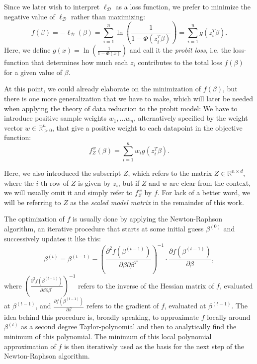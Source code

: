 \noindent Since we later wish to interpret $\ell_\mathcal{D}$ as a loss function, we prefer
to minimize the negative value of $\ell_\mathcal{D}$ rather than maximizing:
\begin{equation}
    f(\beta) = -\ell_\mathcal{D}(\beta)
    = \sum_{i=1}^n \ln \left( \frac{1}{1 - \Phi(z_i^T \beta)} \right)
    = \sum_{i=1}^n g(z_i^T \beta).
\end{equation}
Here, we define $g(x) = \ln \left(\frac{1}{1 - \Phi(x)}\right)$
and call it the \textit{probit loss}, i.e. the loss-function that
determines how much each $z_i$ contributes to the total loss $f(\beta)$
for a given value of $\beta$.

At this point, we could already elaborate on the
minimization of $f(\beta)$, but there is one more
generalization that we have to make, which will
later be needed when applying the theory of data
reduction to the probit model: We have to
introduce positive sample weights $w_1, ... w_n$,
alternatively specified by the weight vector
$w \in \mathbb{R}_{>0}^n$, that give a positive
weight to each datapoint in the objective function:
\begin{equation}
    \label{eq:weighted-objective-function}
    f_Z^w(\beta) = \sum_{i=1}^n w_i g(z_i^T \beta).
\end{equation}

\noindent Here, we also introduced the subscript $Z$,
which refers to the matrix $Z \in \mathbb{R}^{n \times d}$,
where the $i$-th row of $Z$ is given by $z_i$,
but if $Z$ and $w$ are clear from the
context, we will usually omit it and simply refer to
$f_Z^w$ by $f$.
For lack of a better word, we will be referring
to $Z$ as the \textit{scaled model matrix}
in the remainder of this work.

The optimization of $f$ is usually done by applying the
Newton-Raphson algorithm, an iterative procedure that
starts at some initial guess $\beta^{(0)}$ and successively
updates it like this:
\begin{equation}
    \beta^{(t)} = \beta^{(t-1)} - \left(\frac{\partial^2f(\beta^{(t-1)})}{\partial\beta\partial\beta^T}\right)^{-1}
    \cdot \frac{\partial f(\beta^{(t-1)})}{\partial\beta},
\end{equation}
where $\left(\frac{\partial^2f(\beta^{(t-1)})}{\partial\beta\partial\beta^T}\right)^{-1}$
refers to the inverse of the Hessian matrix of $f$, evaluated at
$\beta^{(t-1)}$, and $\frac{\partial f(\beta^{(t-1)})}{\partial\beta}$
refers to the gradient of $f$, evaluated at $\beta^{(t-1)}$.
The idea behind this procedure is, broadly speaking, to approximate
$f$ locally around $\beta^{(t)}$ as a second degree Taylor-polynomial
and then to
analytically find the minimum of this polynomial. The minimum of this
local polynomial approximation of $f$ is then
iteratively used as the basis for the next step of the
Newton-Raphson algorithm.

